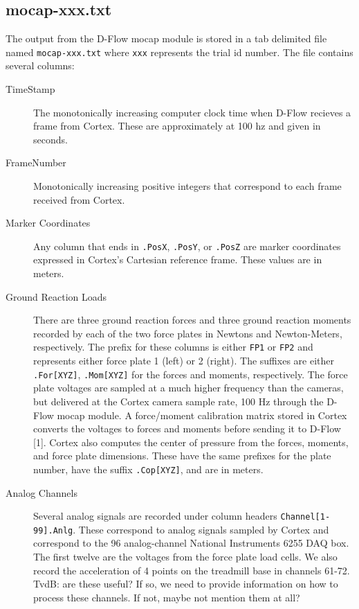 \documentclass{article}
\begin{document}
\subsection{mocap-xxx.txt}

The output from the D-Flow mocap module is stored in a tab delimited file named
\verb+mocap-xxx.txt+ where \verb+xxx+ represents the trial id number. The file
contains several columns:

\begin{description}
  \item[TimeStamp] The monotonically increasing computer clock time when D-Flow
    recieves a frame from Cortex. These are approximately at 100 hz and given
    in seconds.
  \item[FrameNumber] Monotonically increasing positive integers that correspond
    to each frame received from Cortex.
  \item[Marker Coordinates] Any column that ends in \verb+.PosX+, \verb+.PosY+,
    or \verb+.PosZ+ are marker coordinates expressed in Cortex's Cartesian
    reference frame. These values are in meters.
  \item[Ground Reaction Loads] There are three ground reaction forces and three
    ground reaction moments recorded by each of the two force plates in Newtons
    and Newton-Meters, respectively. The prefix for these columns is either
    \verb+FP1+ or \verb+FP2+ and represents either force plate 1 (left) or 2
    (right). The suffixes are either \verb+.For[XYZ]+, \verb+.Mom[XYZ]+ for the
    forces and moments, respectively. The force plate voltages are sampled at a
    much higher frequency than the cameras, but delivered at the Cortex camera
    sample rate, 100 Hz through the D-Flow mocap module. A force/moment
    calibration matrix stored in Cortex converts the voltages to forces and
    moments before sending it to D-Flow [1]. Cortex also computes the center of
    pressure from the forces, moments, and force plate dimensions. These have
    the same prefixes for the plate number, have the suffix \verb+.Cop[XYZ]+,
    and are in meters.
  \item[Analog Channels] Several analog signals are recorded under column
    headers \verb+Channel[1-99].Anlg+. These correspond to analog signals
    sampled by Cortex and correspond to the 96 analog-channel National 
    Instruments 6255 DAQ box. The first twelve are the voltages from the 
    force plate load cells. We also record the acceleration of 4 points on the
    treadmill base in channels 61-72.  TvdB: are these useful?  If so, we need to 
    provide information on how to process these channels.  If not, maybe
    not mention them at all?
\end{description}
\end{document}
